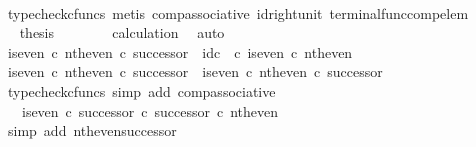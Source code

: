 \begin{isabellebody}
\ \ \ \ \ \ \isamarkupfalse%
\ {\isacharparenleft}{\kern0pt}typecheck{\isacharunderscore}{\kern0pt}cfuncs{\isacharcomma}{\kern0pt}\ metis\ comp{\isacharunderscore}{\kern0pt}associative{}\ id{\isacharunderscore}{\kern0pt}right{\isacharunderscore}{\kern0pt}unit{}\ terminal{\isacharunderscore}{\kern0pt}func{\isacharunderscore}{\kern0pt}comp{\isacharunderscore}{\kern0pt}elem{\isacharparenright}{\kern0pt}\isanewline
\ \ \ \ \isamarkupfalse%
\ \isamarkupfalse%
\ {\isacharquery}{\kern0pt}thesis\isanewline
\ \ \ \ \ \ \isamarkupfalse%
\ calculation\ \isamarkupfalse%
\ auto\isanewline
\ \ \isamarkupfalse%
\isanewline
\isanewline
\ \ \isamarkupfalse%
\ {\isachardoublequoteopen}{\isacharparenleft}{\kern0pt}is{\isacharunderscore}{\kern0pt}even\ {\isasymcirc}\isactrlsub c\ nth{\isacharunderscore}{\kern0pt}even{\isacharparenright}{\kern0pt}\ {\isasymcirc}\isactrlsub c\ successor\ {\isacharequal}{\kern0pt}\ id\isactrlsub c\ {\isasymOmega}\ {\isasymcirc}\isactrlsub c\ is{\isacharunderscore}{\kern0pt}even\ {\isasymcirc}\isactrlsub c\ nth{\isacharunderscore}{\kern0pt}even{\isachardoublequoteclose}\isanewline
\ \ \isamarkupfalse%
\ {\isacharminus}{\kern0pt}\isanewline
\ \ \ \ \isamarkupfalse%
\ {\isachardoublequoteopen}{\isacharparenleft}{\kern0pt}is{\isacharunderscore}{\kern0pt}even\ {\isasymcirc}\isactrlsub c\ nth{\isacharunderscore}{\kern0pt}even{\isacharparenright}{\kern0pt}\ {\isasymcirc}\isactrlsub c\ successor\ {\isacharequal}{\kern0pt}\ is{\isacharunderscore}{\kern0pt}even\ {\isasymcirc}\isactrlsub c\ nth{\isacharunderscore}{\kern0pt}even\ {\isasymcirc}\isactrlsub c\ successor{\isachardoublequoteclose}\isanewline
\ \ \ \ \ \ \isamarkupfalse%
\ {\isacharparenleft}{\kern0pt}typecheck{\isacharunderscore}{\kern0pt}cfuncs{\isacharcomma}{\kern0pt}\ simp\ add{\isacharcolon}{\kern0pt}\ comp{\isacharunderscore}{\kern0pt}associative{}{\isacharparenright}{\kern0pt}\isanewline
\ \ \ \ \isamarkupfalse%
\ \isamarkupfalse%
\ {\isachardoublequoteopen}{\isachardot}{\kern0pt}{\isachardot}{\kern0pt}{\isachardot}{\kern0pt}\ {\isacharequal}{\kern0pt}\ is{\isacharunderscore}{\kern0pt}even\ {\isasymcirc}\isactrlsub c\ successor\ {\isasymcirc}\isactrlsub c\ successor\ {\isasymcirc}\isactrlsub c\ nth{\isacharunderscore}{\kern0pt}even{\isachardoublequoteclose}\isanewline
\ \ \ \ \ \ \isamarkupfalse%
\ {\isacharparenleft}{\kern0pt}simp\ add{\isacharcolon}{\kern0pt}\ nth{\isacharunderscore}{\kern0pt}even{\isacharunderscore}{\kern0pt}successor{}{\isacharparenright}{\kern0pt}\isanewline

\end{isabellebody}
